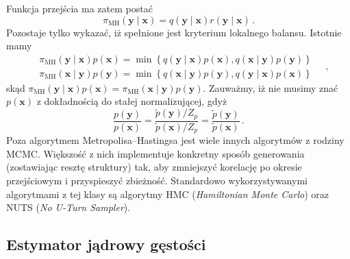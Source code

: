 \documentclass{myclass}
\numberwithin{equation}{subsection}
\begin{document}
Funkcja przejścia ma zatem postać
\[
\pi_\text{MH}(\bm{y}\mid\bm{x}) = q(\bm{y} \mid \bm{x}) r(\bm{y} \mid \bm{x})\,.
\]
Pozostaje tylko wykazać, iż spełnione jest kryterium lokalnego balansu. Istotnie mamy
\[
\begin{split}
&\pi_\text{MH}(\bm{y}\mid\bm{x})p(\bm{x}) = \min\left\{q(\bm{y}\mid\bm{x})p(\bm{x}), q(\bm{x}\mid\bm{y})p(\bm{y})\right\}\\
&\pi_\text{MH}(\bm{x}\mid\bm{y})p(\bm{y}) = \min\left\{q(\bm{x}\mid\bm{y})p(\bm{y}), q(\bm{y}\mid\bm{x})p(\bm{x})\right\}
\end{split}\quad,
\]
skąd \(\pi_\text{MH}(\bm{y}\mid\bm{x})p(\bm{x}) = \pi_\text{MH}(\bm{x}\mid\bm{y})p(\bm{y})\).
Zauważmy, iż nie musimy znać \(p(\bm{x})\) z dokładnością do stałej normalizującej, gdyż
\[
\frac{p(\bm{y})}{p(\bm{x})} = \frac{\tilde{p}(\bm{y})/Z_p}{\tilde{p}(\bm{x})/Z_p} = \frac{\tilde{p}(\bm{y})}{\tilde{p}(\bm{x})}\,.
\]
Poza algorytmem Metropolisa--Hastingsa jest wiele innych algorytmów z rodziny MCMC. Większość z nich
implementuje konkretny sposób generowania (zostawiając resztę struktury) tak, aby zmniejszyć
korelację po okresie przejściowym i przyspieszyć zbieżność. Standardowo wykorzystywanymi algorytmami
z tej klasy są algorytmy HMC (\textit{Hamiltonian Monte Carlo}) oraz NUTS (\textit{No U-Turn
Sampler}).


\subsection{Estymator jądrowy gęstości}
\end{document}
